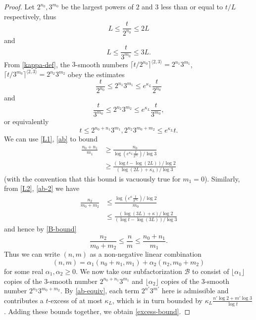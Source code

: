 \documentclass[12pt,a4paper,reqno]{amsart}
\numberwithin{equation}{section}
\theoremstyle{plain}
\theoremstyle{definition}
\newcommand\tuple{{\mathcal B}}
\begin{document}
  \begin{proof}  Let $2^{n_0}, 3^{m_0}$ be the largest powers of $2$ and $3$ less than or equal to $t/L$ respectively, thus
  \begin{equation}\label{L1}
   L \leq \frac{t}{2^{n_0}} \leq 2L
  \end{equation}
    and
    \begin{equation}\label{L2}  L \leq \frac{t}{3^{m_0}} \leq 3L. \end{equation}
  From \eqref{kappa-def}, the $3$-smooth numbers $\lceil t/2^{n_0} \rceil^{\langle 2,3 \rangle} = 2^{n_1} 3^{m_1} $, $\lceil t/3^{m_0} \rceil^{\langle 2,3 \rangle} = 2^{n_2} 3^{m_2}$ obey the estimates
  \begin{equation}\label{ab} 
    \frac{t}{2^{n_0}} \leq 2^{n_1} 3^{m_1} \leq e^{\kappa_L} \frac{t}{2^{n_0}}
  \end{equation}
  and
  \begin{equation}\label{ab-2}
   \frac{t}{3^{m_0}} \leq 2^{n_2} 3^{m_2} \leq e^{\kappa_L} \frac{t}{3^{m_0}},
  \end{equation}
  or equivalently
  \begin{equation}\label{ab-equiv} 
    t \leq 2^{n_0+n_1} 3^{m_1}, 2^{n_2} 3^{m_0+m_2} \leq e^{\kappa_L} t.
  \end{equation}
  We can use \eqref{L1}, \eqref{ab} to bound
  \begin{align*}
    \frac{n_0 + n_1}{m_1} &\geq \frac{n_0}{\log (e^{\kappa_L} \frac{t}{2^{n_0}}) / \log 3} \\
    &\geq \frac{(\log t - \log(2L)) / \log 2}{ (\log(2L)+\kappa_L) / \log 3 }
  \end{align*}
  (with the convention that this bound is vacuously true for $m_1=0$). Similarly, from \eqref{L2}, \eqref{ab-2} we have
  \begin{align*}
    \frac{n_2}{m_0+m_2} &\leq \frac{\log(e^\kappa \frac{t}{3^{m_0}}) / \log 2}{m_0} \\
    &\leq \frac{(\log(3L)+\kappa)/\log 2}{(\log t-\log(3L))/\log 3}
  \end{align*}
  and hence by \eqref{B-bound}
  \begin{equation}\label{m-wedge} \frac{n_2}{m_0+m_2} \leq \frac{n}{m} \leq \frac{n_0+n_1}{m_1}.
  \end{equation}
  Thus we can write $(n,m)$ as a non-negative linear combination
  $$ (n,m) = \alpha_1 (n_0+n_1,m_1) + \alpha_2 (n_2,m_0+m_2)$$
  for some real $\alpha_1, \alpha_2 \geq 0$. We now take our subfactorization $\tuple$ to consist of $\lfloor \alpha_1 \rfloor$ copies of the $3$-smooth number $2^{n_0+n_1} 3^{m_1}$ and $\lfloor \alpha_2 \rfloor$ copies of the $3$-smooth number $2^{n_2} 3^{m_0+m_2}$.  By \eqref{ab-equiv}, each term $2^{n'} 3^{m'}$ here is admissible and contributes a $t$-excess of at most $\kappa_L$, which is in turn bounded by $\kappa_L \frac{n' \log 2 + m' \log 3}{\log t} $.  Adding these bounds together, we obtain \eqref{excess-bound}.
  

\end{proof}
\end{document}
